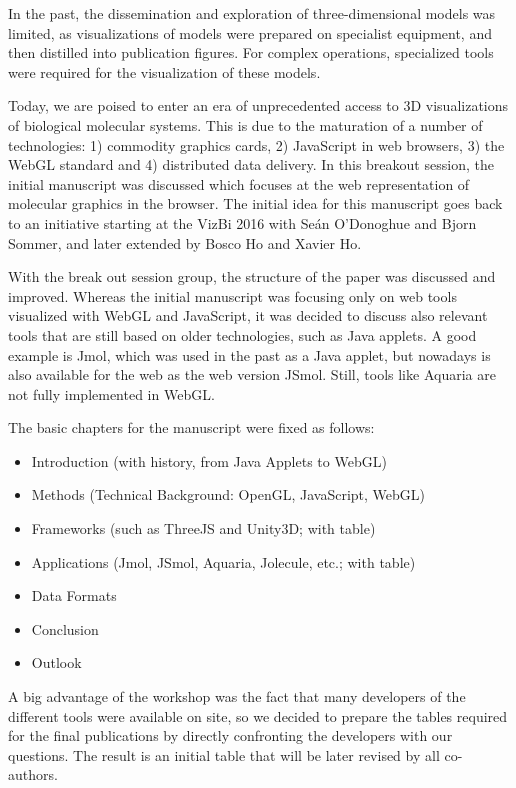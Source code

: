 \documentclass[a4paper]{article}
\begin{document}
In the past, the dissemination and exploration of three-dimensional models was limited, as visualizations of models were prepared on specialist equipment, and then distilled into publication figures. For complex operations, specialized tools were required for the visualization of these models. 

Today, we are poised to enter an era of unprecedented access to 3D visualizations of biological molecular systems.  This is due to the maturation of a number of technologies: 1) commodity graphics cards, 2) JavaScript in web browsers, 3) the WebGL standard and 4) distributed data delivery. 
In this breakout session, the initial manuscript was discussed which focuses at the web representation of molecular graphics in the browser. The initial idea for this manuscript goes back to an initiative starting at the VizBi 2016 with Se\'{a}n O'Donoghue and Bjorn Sommer, and later extended by Bosco Ho and Xavier Ho. 

With the break out session group, the structure of the paper was discussed and improved. Whereas the initial manuscript was focusing only on web tools visualized with WebGL and JavaScript, it was decided to discuss also relevant tools that are still based on older technologies, such as Java applets. A good example is Jmol, which was used in the past as a Java applet, but nowadays is also available for the web as the web version JSmol. Still, tools like Aquaria are not fully implemented in WebGL.

The basic chapters for the manuscript were fixed as follows:
\begin{itemize}
\item Introduction (with history, from Java Applets to WebGL)
\item Methods (Technical Background: OpenGL, JavaScript, WebGL)
\item Frameworks (such as ThreeJS and Unity3D; with table)
\item Applications (Jmol, JSmol, Aquaria, Jolecule, etc.; with table)
\item Data Formats
\item Conclusion
\item Outlook
\end{itemize}

A big advantage of the workshop was the fact that many developers of the different tools were available on site, so we decided to prepare the tables required for the final publications by directly confronting the developers with our questions. The result is an initial table that will be later revised by all co-authors.
\end{document}
